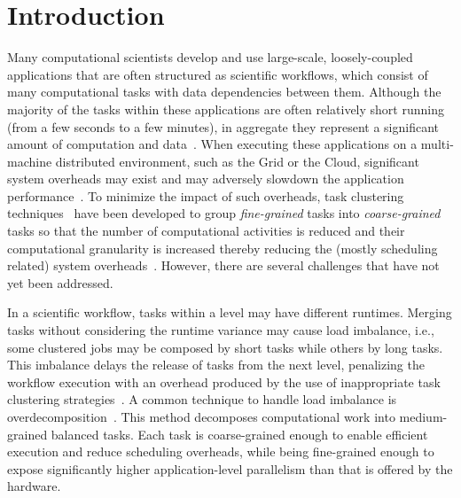\documentclass[final]{IEEEtran}
\begin{document}
\IEEEpeerreviewmaketitle


\section{Introduction}

Many computational scientists develop and use large-scale, loosely-coupled applications that are often structured as scientific workflows, which consist of many computational tasks with data dependencies between them. Although the majority of the tasks within these applications are often relatively short running (from a few seconds to a few minutes), in aggregate they represent a significant amount of computation and data~\cite{LIGO}. When executing these applications on a multi-machine distributed environment, such as the Grid or the Cloud, significant system overheads may exist and may adversely slowdown the application performance~\cite{Chen}. To minimize the impact of such overheads, task clustering techniques~\cite{Muthuvelu:2005:DJG:1082290.1082297,4493929,Muthuvelu2010,Muthuvelu2013170,keat-2006,ang-2009,4958835,Singh:2008:WTC:1341811.1341822,europar-granularity} have been developed to group \emph{fine-grained} tasks into \emph{coarse-grained} tasks so that the number of computational activities is reduced and their computational granularity is increased thereby reducing the (mostly scheduling related) system overheads~\cite{Chen}.
However, there are several challenges that have not yet been addressed.

In a scientific workflow, tasks within a level may have different runtimes. Merging tasks without considering the runtime variance may cause load imbalance, i.e., some clustered jobs may be composed by short tasks while others by long tasks. This imbalance delays the release of tasks from the next level, penalizing the workflow execution with an overhead produced by the use of inappropriate task clustering strategies~\cite{Chen2013}.
A common technique to handle load imbalance is overdecomposition~\cite{Lifflander}.
This method decomposes computational work into medium-grained balanced tasks. Each task is coarse-grained enough to enable efficient execution and reduce scheduling overheads, while being fine-grained enough to expose significantly higher application-level parallelism than that is offered by the hardware. 
\end{document}
